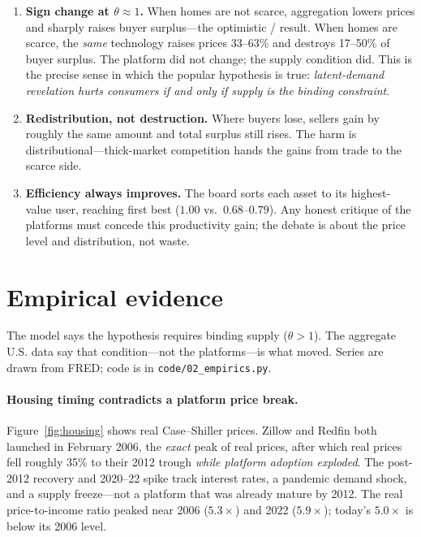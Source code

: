 \documentclass[11pt]{article}
\begin{document}
\begin{enumerate}[leftmargin=1.6em,itemsep=2pt]
\item \textbf{Sign change at $\theta\approx1$.} When homes are not scarce, aggregation lowers prices
and sharply raises buyer surplus---the optimistic \citet{browngoolsbee2002}/\citet{bakos1997}
result. When homes are scarce, the \emph{same} technology raises prices 33--63\% and destroys
17--50\% of buyer surplus. The platform did not change; the supply condition did. This is the precise
sense in which the popular hypothesis is true: \emph{latent-demand revelation hurts consumers if and
only if supply is the binding constraint}.
\item \textbf{Redistribution, not destruction.} Where buyers lose, sellers gain by roughly the same
amount and total surplus still rises. The harm is distributional---thick-market competition hands the
gains from trade to the scarce side.
\item \textbf{Efficiency always improves.} The board sorts each asset to its highest-value user,
reaching first best ($1.00$ vs.\ $0.68$--$0.79$). Any honest critique of the platforms must concede
this productivity gain; the debate is about the price level and distribution, not waste.
\end{enumerate}

\section{Empirical evidence}\label{sec:emp}

The model says the hypothesis requires binding supply ($\theta>1$). The aggregate U.S. data say that
condition---not the platforms---is what moved. Series are drawn from FRED; code is in
\texttt{code/02\_empirics.py}.

\paragraph{Housing timing contradicts a platform price break.}
Figure~\ref{fig:housing} shows real Case--Shiller prices. Zillow and Redfin both launched in
February 2006, the \emph{exact} peak of real prices, after which real prices fell roughly 35\% to
their 2012 trough \emph{while platform adoption exploded}. The post-2012 recovery and 2020--22 spike
track interest rates, a pandemic demand shock, and a supply freeze---not a platform that was already
mature by 2012. The real price-to-income ratio peaked near 2006 ($5.3\times$) and 2022 ($5.9\times$);
today's $5.0\times$ is below its 2006 level.
\end{document}
